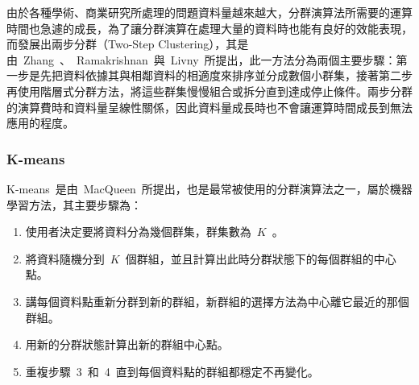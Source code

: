 由於各種學術、商業研究所處理的問題資料量越來越大，分群演算法所需要的運算時間也急遽的成長，為了讓分群演算在處理大量的資料時也能有良好的效能表現，而發展出兩步分群（Two-Step Clustering），其是由~Zhang~、~Ramakrishnan~與~Livny\cite{zhang1996birch}~所提出，此一方法分為兩個主要步驟：第一步是先把資料依據其與相鄰資料的相適度來排序並分成數個小群集，接著第二步再使用階層式分群方法，將這些群集慢慢組合或拆分直到達成停止條件。兩步分群的演算費時和資料量呈線性關係，因此資料量成長時也不會讓運算時間成長到無法應用的程度。


\subsubsection{K-means}

K-means~是由~MacQueen\cite{macqueen67}~所提出，也是最常被使用的分群演算法之一，屬於機器學習方法，其主要步驟為：

\begin{enumerate}
\item 使用者決定要將資料分為幾個群集，群集數為~$K$~。
\item 將資料隨機分到~$K$~個群組，並且計算出此時分群狀態下的每個群組的中心點。
\item 講每個資料點重新分群到新的群組，新群組的選擇方法為中心離它最近的那個群組。
\item 用新的分群狀態計算出新的群組中心點。
\item 重複步驟~3~和~4~直到每個資料點的群組都穩定不再變化。
\end{enumerate}



